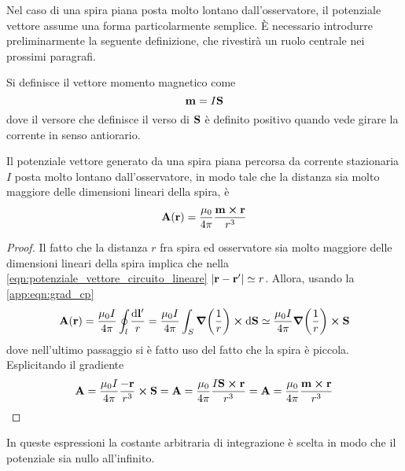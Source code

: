 Nel caso di una spira piana posta molto lontano dall'osservatore, il potenziale vettore assume una forma particolarmente
semplice. È necessario introdurre preliminarmente la seguente definizione, che rivestirà un ruolo
centrale nei prossimi paragrafi.
\begin{defn}
    Si definisce il vettore momento magnetico come
    \[
        \vb{m}=I\vb{S}
    \]
    dove il versore che definisce il verso di $\vb{S}$ è definito positivo quando vede girare la corrente in senso
    antiorario.
\end{defn}
\begin{cor}
Il potenziale vettore generato da una spira piana percorsa da corrente stazionaria $I$ posta molto
lontano dall'osservatore, in modo tale che la distanza sia molto maggiore delle dimensioni lineari
della spira, è
    \begin{equation}
        \label{eqn:potenziale_vettore_momento_magnetico}
        \vb{A}(\vb{r})=\frac{\mu_0}{4\pi}\frac{\vb{m}\cp\vb{r}}{r^3}
    \end{equation}
\end{cor}
\begin{proof}
    Il fatto che la distanza $r$ fra spira ed osservatore sia molto maggiore delle dimensioni lineari della spira
    implica che nella \eqref{eqn:potenziale_vettore_circuito_lineare} $\abs{\vb{r}-\vb{r}'}\simeq r$. Allora,
    usando la \eqref{app:eqn:grad_cp}
    \[
        \vb{A}(\vb{r})=\frac{\mu_0 I}{4\pi}\oint_l \frac{\dd{\vb{l}'}}{r}=
        \frac{\mu_0 I}{4\pi}\int_S \grad(\rec{r})\cp\dd{\vb{S}}\simeq
        \frac{\mu_0 I}{4\pi} \grad(\rec{r})\cp\vb{S}
    \]
    dove nell'ultimo passaggio si è fatto uso del fatto che la spira è piccola. Esplicitando il gradiente
    \[
        \vb{A}=\frac{\mu_0 I}{4\pi}\frac{-\vb{r}}{r^3}\cp\vb{S}=
        \vb{A}=\frac{\mu_0 }{4\pi}\frac{I\vb{S}\cp\vb{r}}{r^3}=
        \vb{A}=\frac{\mu_0 }{4\pi}\frac{\vb{m}\cp\vb{r}}{r^3}
    \]
\end{proof}
In queste espressioni la costante arbitraria di integrazione è scelta in modo che il potenziale sia nullo all'infinito.

